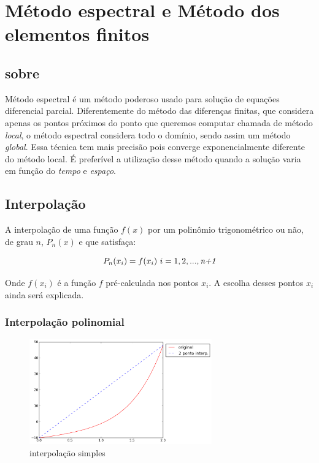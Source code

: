 \chapter{Método espectral e Método dos elementos finitos}
\label{cap:I}
\section{sobre}

 Método espectral é um método poderoso usado para solução de equações diferencial parcial. Diferentemente do método das diferenças finitas, que considera apenas os pontos próximos do ponto que queremos computar chamada de método \emph{local}, o método espectral considera todo o domínio, sendo assim um método \emph{global}. Essa técnica tem mais precisão pois converge exponencialmente diferente do método local. É preferível a utilização desse método quando a solução varia em função do \textit{tempo} e \textit{espaço}. 

\section{Interpolação}
 A interpolação de uma função $f(x)$ por um polinômio trigonométrico ou não, de grau $n$, $P_{n}(x)$ e que satisfaça:

\begin{equation}
	P_n (x_i) = f(x_i) \ i = 1,2,...,\emph{n+1}
\end{equation}

 Onde $f(x_i)$ é a função $f$ pré-calculada nos pontos $x_i$. A escolha desses pontos $x_i$ ainda será explicada.

\subsection{Interpolação polinomial}
 \begin{figure}[!ht]
  \includegraphics[width=0.7\textwidth,center]{figuras/interpolacao_linear.png}
  \caption{interpolação simples}
\end{figure}


